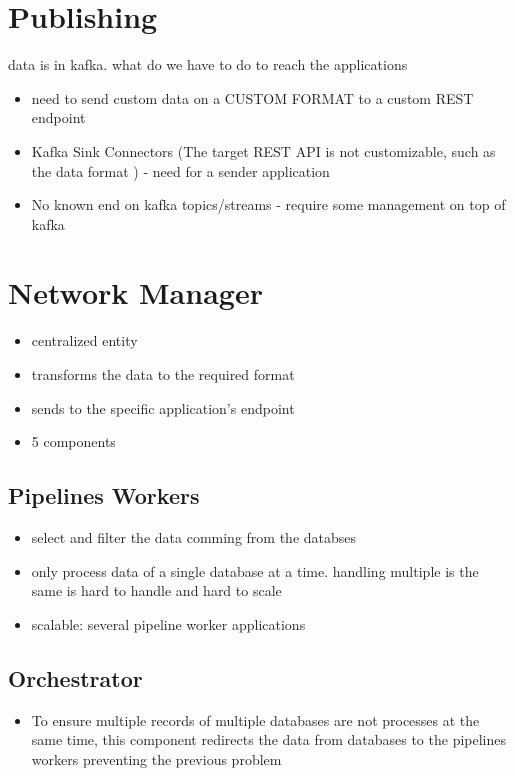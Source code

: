 \section{Publishing}

data is in kafka. what do we have to do to reach the applications

\begin{itemize}
    \item need to send custom data on a CUSTOM FORMAT to a custom REST endpoint
    \item Kafka Sink Connectors (The target REST API is not customizable, such as the data format ) - need for a sender application
    \item No known end on kafka topics/streams - require some management on top of kafka
\end{itemize}

\section{Network Manager}  %
\begin{itemize}
    \item centralized entity
    \item transforms the data to the required format
    \item sends to the specific application's endpoint
    \item 5 components
\end{itemize}

\subsection{Pipelines Workers}
\begin{itemize}
    \item select and filter the data comming from the databses
    \item only process data of a single database at a time. handling multiple is the same is hard to handle and hard to scale
    \item scalable: several pipeline worker applications
\end{itemize}

\subsection{Orchestrator}
\begin{itemize}
    \item To ensure multiple records of multiple databases are not processes at the same time, this component redirects the data from databases to the pipelines workers preventing the previous problem
\end{itemize}

